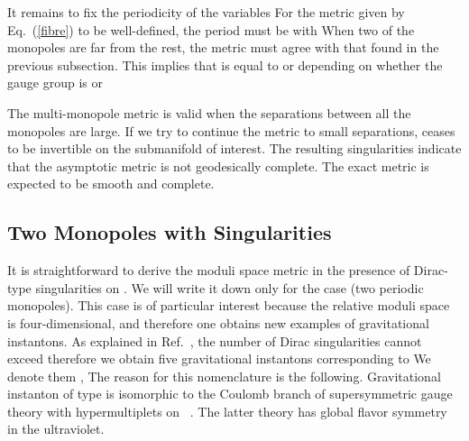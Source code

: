 \documentclass[a4paper,12pt, amsfonts, amssymb]{article}
\providecommand{\RR}{{\mathbb R}}
\providecommand{\NN}{{\mathbb N}}
\renewcommand{\SS}{{\mathbb S}}
\begin{document}
It remains to fix the periodicity of the variables \coordHE{}
For the metric given by Eq.~(\ref{fibre}) to be well-defined,
the period must be \coordHE{} with \myHighlight{$p\in\NN.$}\coordHE{}
When two of the monopoles are far from the rest, the
metric must agree with that found in the previous subsection.
This implies that \coordHE{} is equal to \coordHE{} or \coordHE{} depending on whether the
gauge group is \coordHE{} or \coordHE{}

The multi-monopole metric is valid when the separations \coordHE{}
between all the monopoles are large. If we try to continue the metric to
small separations, \coordHE{} ceases to be invertible on the submanifold of interest. The resulting singularities indicate that the asymptotic
metric is not geodesically complete. The exact metric is expected to be
smooth and complete.

\subsection{Two Monopoles with Singularities}

It is straightforward to derive the moduli space metric in the
presence of Dirac-type singularities on \myHighlight{$\RR^2\times\SS^1$}\coordHE{}.
We will write it down only for the case \coordHE{} (two periodic monopoles).
This case is of particular interest because the relative moduli space is
four-dimensional, and therefore one obtains new examples of gravitational
instantons. As explained in Ref.~\cite{ustwo}, the number of Dirac singularities
\coordHE{} cannot exceed \coordHE{} therefore we obtain five gravitational
instantons corresponding to \coordHE{} We denote them \coordHE{},
\coordHE{} The reason for this nomenclature is the following.
Gravitational instanton of type \coordHE{} is isomorphic to the Coulomb branch
of \coordHE{} supersymmetric \coordHE{} gauge theory with \coordHE{} hypermultiplets
on \myHighlight{$\RR^3\times\SS^1$}\coordHE{}~\cite{ustwo}. The latter theory has \coordHE{} global flavor symmetry in the ultraviolet.
\end{document}
